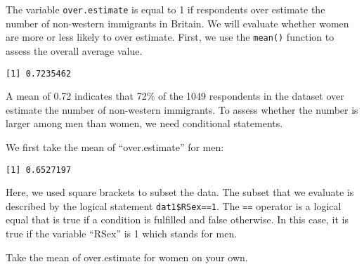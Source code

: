 \documentclass[]{article}
\newenvironment{Shaded}{\begin{snugshade}}{\end{snugshade}}
\newcommand{\DecValTok}[1]{\textcolor[rgb]{0.00,0.00,0.81}{#1}}
\newcommand{\KeywordTok}[1]{\textcolor[rgb]{0.13,0.29,0.53}{\textbf{#1}}}
\newcommand{\NormalTok}[1]{#1}
\newcommand{\OperatorTok}[1]{\textcolor[rgb]{0.81,0.36,0.00}{\textbf{#1}}}
\newcommand{\StringTok}[1]{\textcolor[rgb]{0.31,0.60,0.02}{#1}}
\begin{document}
The variable \texttt{over.estimate} is equal to 1 if respondents over estimate the number of non-western immigrants in Britain. We will evaluate whether women are more or less likely to over estimate. First, we use the \texttt{mean()} function to assess the overall average value.

\begin{Shaded}
\end{Shaded}

\begin{verbatim}
[1] 0.7235462
\end{verbatim}

A mean of 0.72 indicates that 72\% of the 1049 respondents in the dataset over estimate the number of non-western immigrants. To assess whether the number is larger among men than women, we need conditional statements.

We first take the mean of ``over.estimate'' for men:

\begin{Shaded}
\end{Shaded}

\begin{verbatim}
[1] 0.6527197
\end{verbatim}

Here, we used square brackets to subset the data. The subset that we evaluate is described by the logical statement \texttt{dat1\$RSex==1}. The \texttt{==} operator is a logical equal that is true if a condition is fulfilled and false otherwise. In this case, it is true if the variable ``RSex'' is 1 which stands for men.

Take the mean of over.estimate for women on your own.

\begin{Shaded}
\end{Shaded}
\end{document}
